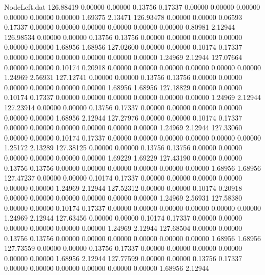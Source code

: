 \begin{filecontents}{NodeLeft.dat}
 126.88419    0.00000    0.00000     0.13756    0.17337    0.00000    0.00000    0.00000    0.00000    0.00000    0.00000    1.69375    2.13471
 126.93478    0.00000    0.00000     0.06593    0.17337    0.00000    0.00000    0.00000    0.00000    0.00000    0.00000    0.80981    2.12944
 126.98534    0.00000    0.00000     0.13756    0.13756    0.00000    0.00000    0.00000    0.00000    0.00000    0.00000    1.68956    1.68956
 127.02600    0.00000    0.00000     0.10174    0.17337    0.00000    0.00000    0.00000    0.00000    0.00000    0.00000    1.24969    2.12944
 127.07664    0.00000    0.00000     0.10174    0.20918    0.00000    0.00000    0.00000    0.00000    0.00000    0.00000    1.24969    2.56931
 127.12741    0.00000    0.00000     0.13756    0.13756    0.00000    0.00000    0.00000    0.00000    0.00000    0.00000    1.68956    1.68956
 127.18829    0.00000    0.00000     0.10174    0.17337    0.00000    0.00000    0.00000    0.00000    0.00000    0.00000    1.24969    2.12944
 127.23914    0.00000    0.00000     0.13756    0.17337    0.00000    0.00000    0.00000    0.00000    0.00000    0.00000    1.68956    2.12944
 127.27976    0.00000    0.00000     0.10174    0.17337    0.00000    0.00000    0.00000    0.00000    0.00000    0.00000    1.24969    2.12944
 127.33060    0.00000    0.00000     0.10174    0.17337    0.00000    0.00000    0.00000    0.00000    0.00000    0.00000    1.25172    2.13289
 127.38125    0.00000    0.00000     0.13756    0.13756    0.00000    0.00000    0.00000    0.00000    0.00000    0.00000    1.69229    1.69229
 127.43190    0.00000    0.00000     0.13756    0.13756    0.00000    0.00000    0.00000    0.00000    0.00000    0.00000    1.68956    1.68956
 127.47237    0.00000    0.00000     0.10174    0.17337    0.00000    0.00000    0.00000    0.00000    0.00000    0.00000    1.24969    2.12944
 127.52312    0.00000    0.00000     0.10174    0.20918    0.00000    0.00000    0.00000    0.00000    0.00000    0.00000    1.24969    2.56931
 127.58380    0.00000    0.00000     0.10174    0.17337    0.00000    0.00000    0.00000    0.00000    0.00000    0.00000    1.24969    2.12944
 127.63456    0.00000    0.00000     0.10174    0.17337    0.00000    0.00000    0.00000    0.00000    0.00000    0.00000    1.24969    2.12944
 127.68504    0.00000    0.00000     0.13756    0.13756    0.00000    0.00000    0.00000    0.00000    0.00000    0.00000    1.68956    1.68956
 127.73559    0.00000    0.00000     0.13756    0.17337    0.00000    0.00000    0.00000    0.00000    0.00000    0.00000    1.68956    2.12944
 127.77599    0.00000    0.00000     0.13756    0.17337    0.00000    0.00000    0.00000    0.00000    0.00000    0.00000    1.68956    2.12944

\end{filecontents}

